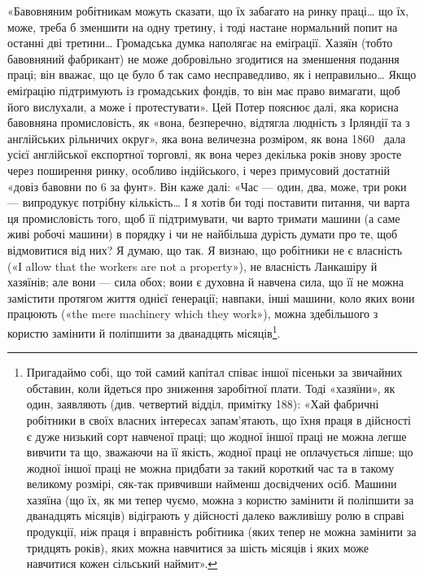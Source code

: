 «Бавовняним робітникам можуть сказати, що їх забагато на
ринку праці\dots{} що їх, може, треба б зменшити на одну третину,
і тоді настане нормальний попит на останні дві третини\dots{} Громадська
думка наполягає на еміґрації. Хазяїн (тобто бавовняний
фабрикант) не може добровільно згодитися на зменшення подання
праці; він вважає, що це було б так само несправедливо, як
і неправильно\dots{} Якщо еміґрацію підтримують із громадських
фондів, то він має право вимагати, щоб його вислухали, а може
і протестувати». Цей Потер пояснює далі, яка корисна бавовняна
промисловість, як «вона, безперечно, відтягла людність з Ірляндії
та з англійських рільничих округ», яка вона величезна розміром,
як вона 1860~ дала  усієї англійської експортної
торговлі, як вона через декілька років знову зросте через поширення
ринку, особливо індійського, і через примусовий достатній
«довіз бавовни по 6 за фунт». Він каже далі: «Час — один,
два, може, три роки — випродукує потрібну кількість\dots{} І я хотів би
тоді поставити питання, чи варта ця промисловість того, щоб її
підтримувати, чи варто тримати машини (а саме живі робочі
машини) в порядку і чи не найбільша дурість думати про те, щоб
відмовитися від них? Я думаю, що так. Я визнаю, що робітники
не є власність («І allow that the workers are not a property»),
не власність Ланкашіру й хазяїнів; але вони — сила обох; вони
є духовна й навчена сила, що її не можна замістити протягом
життя однієї ґенерації; навпаки, інші машини, коло яких вони
працюють («the mere machinery which they work»), можна здебільшого
з користю замінити й поліпшити за дванадцять місяців\footnote{
Пригадаймо собі, що той самий капітал співає іншої пісеньки за
звичайних обставин, коли йдеться про зниження заробітної плати. Тоді
«хазяїни», як один, заявляють (див. четвертий відділ, примітку 188):
«Хай фабричні робітники в своїх власних інтересах запам’ятають, що їхня
праця в дійсності є дуже низький сорт навченої праці; що жодної іншої
праці не можна легше вивчити та що, зважаючи на її якість, жодної
праці не оплачується ліпше; що жодної іншої праці не можна придбати
за такий короткий час та в такому великому розмірі, сяк-так привчивши
найменш досвідчених осіб. Машини хазяїна (що їх, як ми тепер
чуємо, можна з користю замінити й поліпшити за дванадцять місяців)
відіграють у дійсності далеко важливішу ролю в справі продукції, ніж
праця і вправність робітника (яких тепер не можна замінити за тридцять
років), яких можна навчитися за шість місяців і яких може навчитися
кожен сільський наймит».
}.
